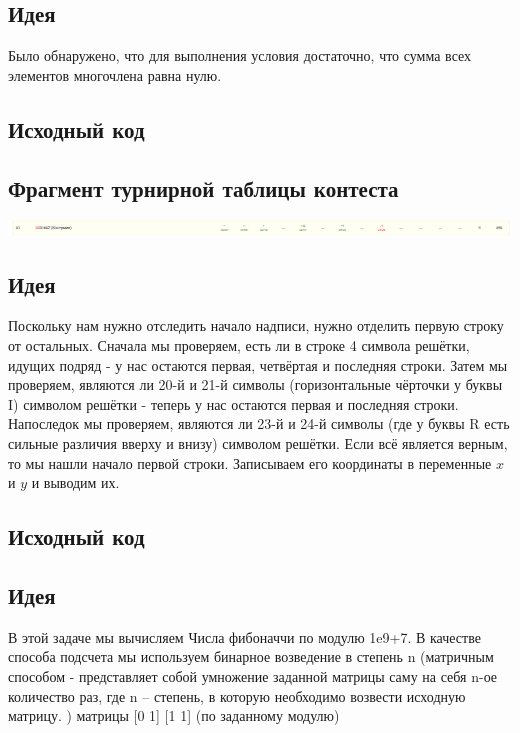 \subsection*{Идея}
Было обнаружено, что для выполнения условия достаточно, что сумма всех элементов многочлена равна нулю.
\subsection*{Исходный код}

\subsection*{Фрагмент турнирной таблицы контеста}
\includegraphics[scale=0.3]{standings/2404.png}\newline\noindent
\pagebreak


\subsection*{Идея}
Поскольку нам нужно отследить начало надписи, нужно отделить первую строку от остальных. Сначала мы проверяем, есть ли в строке 4 символа решётки, идущих подряд - у нас остаются первая, четвёртая и последняя строки. Затем мы проверяем, являются ли 20-й и 21-й символы (горизонтальные чёрточки у буквы I) символом решётки - теперь у нас остаются первая и последняя строки. Напоследок мы проверяем, являются ли 23-й и 24-й символы (где у буквы R есть сильные различия вверху и внизу) символом решётки. Если всё является верным, то мы нашли начало первой строки. Записываем его координаты в переменные $x$ и $y$ и выводим их.
\subsection*{Исходный код}


\subsection*{Идея}
В этой задаче мы вычисляем Числа фибоначчи по модулю 1e9+7. В качестве способа подсчета мы используем бинарное возведение в степень n (матричным способом - представляет собой умножение заданной матрицы саму на себя n-ое количество раз, где n – степень, в которую необходимо возвести исходную матрицу. ) матрицы [0 1] [1 1] (по заданному модулю)
